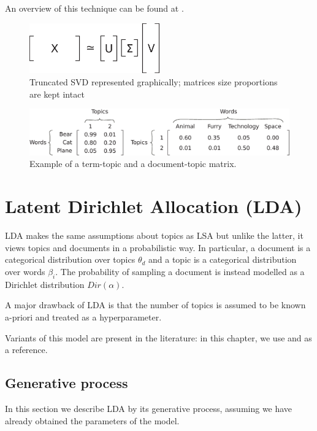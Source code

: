 An overview of this technique can be found at \cite{doi:10.1002/aris.1440380105}.

\begin{figure}[ht]
    \centering
    \includegraphics[width=0.5\textwidth]{images/svd.eps}
    \caption{Truncated SVD represented graphically; matrices size proportions are kept intact}
    \label{fig:svd}
\end{figure}

\begin{figure}[ht]
    \centering
    \includegraphics[width=\textwidth]{images/topic-mat.eps}
    \caption{Example of a term-topic and a document-topic matrix.}
    \label{fig:topicmat}
\end{figure}

\section{Latent Dirichlet Allocation (LDA)}
LDA makes the same assumptions about topics as LSA but unlike the latter, it views topics and documents in a probabilistic way.
In particular, a document is a categorical distribution over topics $\theta_d$ and a topic is a categorical distribution over words $\beta_i$.
The probability of sampling a document is instead modelled as a Dirichlet distribution $Dir(\alpha)$.

A major drawback of LDA is that the number of topics is assumed to be known a-priori and treated as a hyperparameter.

Variants of this model are present in the literature: in this chapter, we use \cite{10.1145/2107736.2107741} and \cite{DBLP:journals/jmlr/BleiNJ03} as a reference.

\subsection{Generative process} \label{gp}
In this section we describe LDA by its generative process, assuming we have already obtained the parameters of the model.

